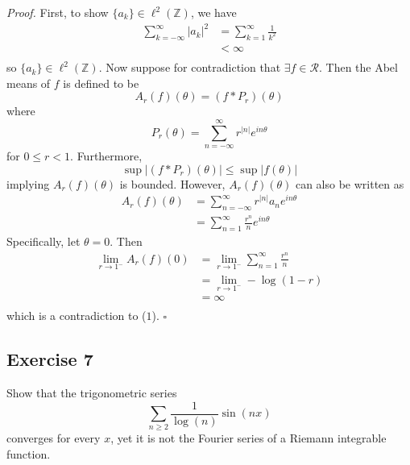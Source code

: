 \documentclass[12pt]{article}
\newenvironment{proof}{\textit{Proof.}}{\hfill$\square$}
\newcommand{\bbz}{\mathbb{Z}}
\newcommand{\calr}{\mathcal{R}}
\begin{document}
\vspace{2em}
\begin{proof}
    First, to show $\{a_k\}\in \ell^2(\bbz)$, we have
    \begin{align*}
        \sum_{k=-\infty}^{\infty}|a_k|^2 &=\sum_{k=1}^{\infty}\frac{1}{k^2} \\
        &<\infty \\
    \end{align*}
    so $\{a_k\}\in \ell^2(\bbz)$. Now suppose for contradiction that $\exists f\in\calr$. Then the Abel means of $f$ is defined to be
    \begin{equation*}
        A_r(f)(\theta)=(f*P_r)(\theta)
    \end{equation*}
    where 
    \begin{equation*}
        P_r(\theta) = \sum_{n=-\infty}^{\infty}r^{|n|}e^{in\theta}
    \end{equation*}
    for $0\le r<1$. Furthermore,  
    \begin{equation}
        \sup|(f*P_r)(\theta)|\le\sup|f(\theta)|
    \end{equation}
    implying $A_r(f)(\theta)$ is bounded. However, $A_r(f)(\theta)$ can also be written as
    \begin{align*}
        A_r(f)(\theta) &= \sum_{n=-\infty}^{\infty}r^{|n|}a_ne^{in\theta} \\
        &= \sum_{n=1}^{\infty}\frac{r^n}{n}e^{in\theta}
    \end{align*}
    Specifically, let $\theta = 0$. Then
    \begin{align*}
        \lim_{r\to1^-}A_r(f)(0) &= \lim_{r\to1^-}\sum_{n=1}^{\infty}\frac{r^n}{n} \\
        &= \lim_{r\to1^-}-\log(1-r) \\
        &= \infty \\
    \end{align*}
    which is a contradiction to ($1$).
\end{proof}
\newpage
\setcounter{equation}{0}
\subsection*{Exercise 7}
Show that the trigonometric series
\begin{equation*}
    \sum_{n\ge2}\frac{1}{\log(n)}\sin(nx)
\end{equation*}
converges for every $x$, yet it is not the Fourier series of a Riemann integrable function.
\end{document}
